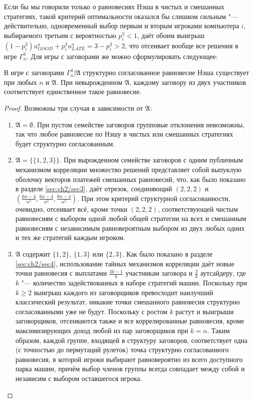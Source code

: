 Если бы мы говорили только о равновесиях Нэша в чистых и смешанных стратегиях, такой критерий оптимальности оказался бы слишком сильным "--- действительно, одновременный выбор первым и вторым игроками компьютера $i$, выбираемого третьим с вероятностью $p_i^3 < 1$, даёт обоим выигрыш $(1 - p_i^3) u^a_{GOOD} + p_i^3 u^a_{LATE} = 3 - p_i^3 > 2$, что отсеивает вообще все решения в игре $\Gamma^3_n$. Для игры с заговорами же можно сформулировать следующее:

\begin{theorem}
	В игре с заговорами $\Gamma^3_n | \mathfrak{A}$ структурно согласованное равновесие Нэша существует при любых $n$ и $\mathfrak{A}$. При невырожденном $\mathfrak{A}$, каждому заговору из двух участников соответствует единственное такое равновесие.
\end{theorem}

\begin{proof}
	Возможны три случая в зависимости от $\mathfrak{A}$:
	\begin{enumerate}
		\item $\mathfrak{A} = \emptyset$. При пустом семействе заговоров групповые отклонения невозможны, так что любое равновесие по Нэшу в чистых или смешанных стратегиях будет структурно согласованным.
		\item $\mathfrak{A} = \{\{1, 2, 3\}\}$. При вырожденном семействе заговоров с одним публичным механизмом корреляции множество решений представляет собой выпуклую оболочку векторов платежей смешанных равновесий, что, как было показано в разделе \ref{sec:ch2/sec3}, даёт отрезок, соединяющий $(2, 2, 2)$ и $(\frac{6 n - 4}{n^2}, \frac{6 n - 4}{n^2}, \frac{6 n - 4}{n^2})$. При этом критерий структурной согласованности, очевидно, отсеивает всё, кроме точки $(2, 2, 2)$, соответствующей чистым равновесиям с выбором одной любой общей стратегии на всех и смешанным равновесиям с независимым равновероятным выбором из двух любых одних и тех же стратегий каждым игроком.
		\item $\mathfrak{A}$ содержит $\{1, 2\}$, $\{1, 3\}$ или $\{2, 3\}$. Как было показано в разделе \ref{sec:ch2/sec4}, использование тайных механизмов корреляции даёт новые точки равновесия с выплатами $\frac{3k - 1}{k}$ участникам заговора и $\frac{2}{k}$ аутсайдеру, где $k$ "--- количество задействованных в наборе стратегий машин. Поскольку при $k \ge 2$ выигрыш каждого из заговорщиков превосходит наилучший классический результат, никакие точки смешанного равновесия структурно согласованными уже не будут. Поскольку с ростом $k$ растут и выигрыши заговорщиков, отсеиваются также и все коррелированные равновесия, кроме максимизирующих доход любой из пар заговорщиков при $k = n$. Таким образом, каждой группе, входящей в структуру заговоров, соответствует одна (с точностью до пермутаций рулеток) точка структурно согласованного равновесия, в которой игроки выбирают равновероятно из всего доступного парка машин, причём выбор членов группы всегда совпадает между собой и независим с выбором оставшегося игрока.
	\end{enumerate}
\end{proof}

